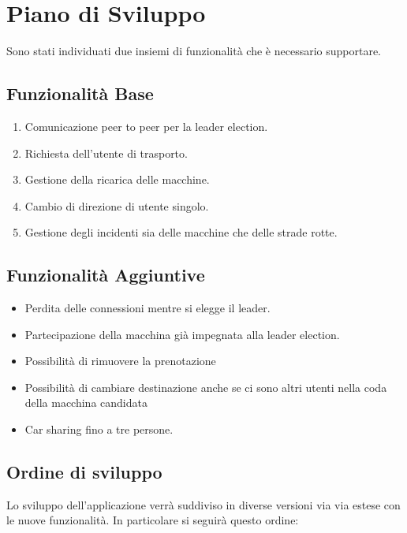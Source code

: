 \section{Piano di Sviluppo}

Sono stati individuati due insiemi di funzionalità che è necessario supportare.
\subsection{Funzionalità Base}

\begin{enumerate}
	\item Comunicazione peer to peer per la leader election.
	\item Richiesta dell'utente di trasporto.
	\item Gestione della ricarica delle macchine.
	\item Cambio di direzione di utente singolo.
	\item Gestione degli incidenti sia delle macchine che delle strade rotte.
\end{enumerate}

\subsection{Funzionalità Aggiuntive}

\begin{itemize}
	\item Perdita delle connessioni mentre si elegge il leader.
	\item Partecipazione della macchina già impegnata alla leader election.
	\item Possibilità di rimuovere la prenotazione
	\item Possibilità di cambiare destinazione anche se ci sono altri utenti nella coda della macchina candidata
	\item Car sharing fino a tre persone.
\end{itemize}

\subsection{Ordine di sviluppo}
Lo sviluppo dell'applicazione verrà suddiviso in diverse versioni via via estese con le nuove funzionalità. In particolare si seguirà questo ordine:

